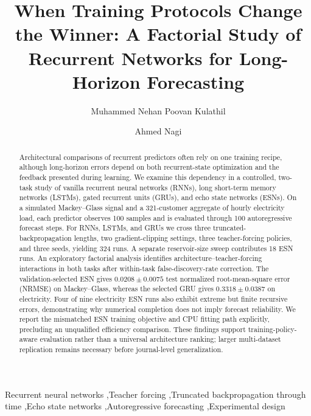 \documentclass[final,5p,times,twocolumn]{elsarticle}
\begin{document}
\begin{frontmatter}
\title{When Training Protocols Change the Winner: A Factorial Study of Recurrent Networks for Long-Horizon Forecasting}
\author[au]{Muhammed Nehan Poovan Kulathil}
\author[au]{Ahmed Nagi}
\address[au]{College of Engineering and Information Technology, Ajman University, Ajman, United Arab Emirates}

\begin{abstract}
Architectural comparisons of recurrent predictors often rely on one training recipe, although long-horizon errors depend on both recurrent-state optimization and the feedback presented during learning. We examine this dependency in a controlled, two-task study of vanilla recurrent neural networks (RNNs), long short-term memory networks (LSTMs), gated recurrent units (GRUs), and echo state networks (ESNs). On a simulated Mackey--Glass signal and a 321-customer aggregate of hourly electricity load, each predictor observes 100 samples and is evaluated through 100 autoregressive forecast steps. For RNNs, LSTMs, and GRUs we cross three truncated-backpropagation lengths, two gradient-clipping settings, three teacher-forcing policies, and three seeds, yielding 324 runs. A separate reservoir-size sweep contributes 18 ESN runs. An exploratory factorial analysis identifies architecture--teacher-forcing interactions in both tasks after within-task false-discovery-rate correction. The validation-selected ESN gives $0.0208\pm0.0075$ test normalized root-mean-square error (NRMSE) on Mackey--Glass, whereas the selected GRU gives $0.3318\pm0.0387$ on electricity. Four of nine electricity ESN runs also exhibit extreme but finite recursive errors, demonstrating why numerical completion does not imply forecast reliability. We report the mismatched ESN training objective and CPU fitting path explicitly, precluding an unqualified efficiency comparison. These findings support training-policy-aware evaluation rather than a universal architecture ranking; larger multi-dataset replication remains necessary before journal-level generalization.
\end{abstract}

\begin{keyword}
Recurrent neural networks \sep Teacher forcing \sep Truncated backpropagation through time \sep Echo state networks \sep Autoregressive forecasting \sep Experimental design
\end{keyword}
\end{frontmatter}
\end{document}
